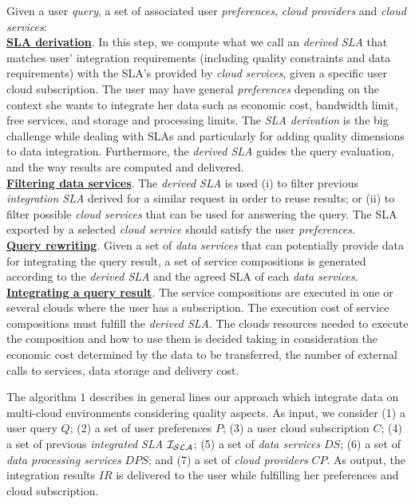 Given a user \textit{query}, a set of associated user \textit{preferences}, \textit{cloud providers} and \textit{cloud services}:
\\
\textbf{\underline{SLA derivation}}. In this step, we compute what we call an \textsl{derived SLA} that matches user' integration requirements (including quality constraints and data requirements) with the SLA's provided by \textit{cloud services}, given a specific user cloud subscription. The user may have general \textit{preferences} depending on the context she wants to integrate her data such as economic cost, bandwidth limit, free services, and storage and processing limits. The \textit{SLA derivation} is the big challenge while dealing with SLAs and particularly for adding quality dimensions to data integration. Furthermore, the \textsl{derived SLA} guides the query evaluation, and the way results are computed and delivered. \\
\textbf{\underline{Filtering data services}}. The \textsl{derived SLA} is used (i)
to filter previous \textsl{integration SLA} derived for a similar request in order to reuse results; or (ii) to filter possible \textit{cloud services} that can be used for answering the query. The SLA exported by a selected \textit{cloud service} should satisfy the user \textit{preferences}. \\
\textbf{\underline{Query rewriting}}. Given a set of \textit{data services} that can
potentially provide data for integrating the query result, a set of service compositions is generated according to the \textsl{derived SLA} and the agreed SLA of each \textit{data services}. \\
\textbf{\underline{Integrating a query result}}. The service compositions are executed
in one or several clouds where the user has a subscription. The execution cost of service compositions must fulfill the \textsl{derived SLA}. The clouds resources needed to execute the composition and how to use them is decided taking in consideration the economic cost determined by the data to be transferred, the number of external calls to services, data storage and delivery cost.

The algorithm 1 describes in general lines our approach which integrate data on multi-cloud environments considering quality aspects. 
%
As input, we consider (1) a user query $Q$; (2) a set of user preferences $P$; (3) a user cloud subscription $C$; (4) a set of previous \textit{integrated SLA} $\bigSLA$; (5) a set of \textit{data services} $DS$; (6) a set of \textit{data processing services} $DPS$; and (7) a set of \textit{cloud providers} $CP$. As output, the integration results $IR$ is delivered to the user while fulfilling her preferences and cloud subscription. 
%

